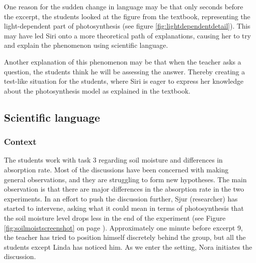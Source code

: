 One reason for the sudden change in language may be that only seconds before the excerpt, the students looked at the figure from the textbook, representing the light-dependent part of photosynthesis (see figure \ref{fig:lightdependentdetail}). This may have led Siri onto a more theoretical path of explanations, causing her to try and explain the phenomenon using scientific language. 

Another explanation of this phenomenon may be that when the teacher asks a question, the students think he will be assessing the answer. Thereby creating a test-like situation for the students, where Siri is eager to express her knowledge about the photosynthesis model as explained in the textbook. 

\subsection{Scientific language}
\subsubsection*{Context}
The students work with task 3 regarding soil moisture and differences in absorption rate. Most of the discussions have been concerned with making general observations, and they are struggling to form new hypotheses. The main observation is that there are major differences in the absorption rate in the two experiments. In an effort to push the discussion further, Sjur (researcher) has started to intervene, asking what it could mean in terms of photosynthesis that the soil moisture level drops less in the end of the experiment (see Figure \ref{fig:soilmoistscreenshot} on page \pageref{fig:soilmoistscreenshot}). Approximately one minute before excerpt 9, the teacher has tried to position himself discretely behind the group, but all the students except Linda has noticed him. As we enter the setting, Nora initiates the discussion.

